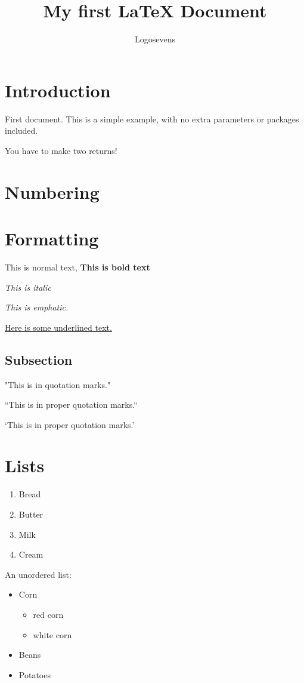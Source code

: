 \documentclass{article}
\author{Logosevens}
\title{My first {\LaTeX} Document}
\begin{document}
\maketitle

\section{Introduction}

First document. This is a simple example, with no
extra parameters or packages included.

You have to make two returns!

\section{Numbering}

\section{Formatting}

This is normal text, \textbf{This is bold text}

\textit{This is italic}

\emph{This is emphatic.}

\underline{Here is some underlined text.}

\subsection{Subsection}

"This is in quotation marks."

``This is in proper quotation marks.``

`This is in proper quotation marks.'

\newpage

\section{Lists\label{list}}

\begin{enumerate}
  \item Bread
  \item Butter
  \item Milk
  \item Cream\label{cream}
\end{enumerate}

An unordered list:

\begin{itemize}
  \item Corn
    \begin{itemize}
      \item red corn
      \item white corn
    \end{itemize}
  \item Beans
  \item Potatoes
\end{itemize}
\end{document}
